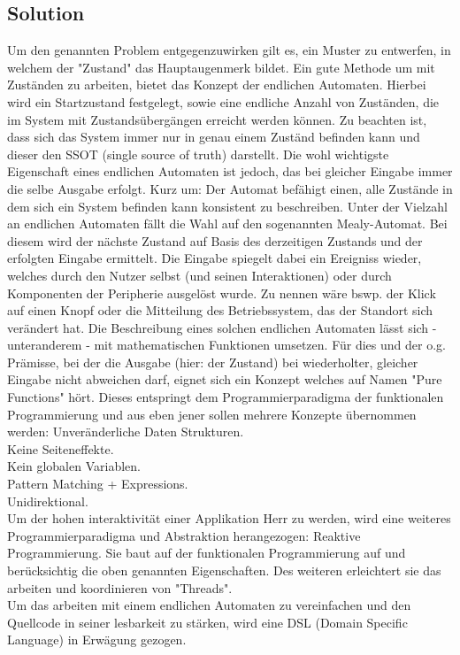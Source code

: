 \subsection{Solution}
\label{subsec:solution}

Um den genannten Problem entgegenzuwirken gilt es, ein Muster zu entwerfen,
in welchem der "Zustand" das Hauptaugenmerk bildet.
Ein gute Methode um mit Zuständen zu arbeiten, bietet das Konzept der endlichen Automaten.
Hierbei wird ein Startzustand festgelegt, sowie eine endliche Anzahl von Zuständen, die im System mit
Zustandsübergängen erreicht werden können. Zu beachten ist, dass sich das System immer nur in genau
einem Zuständ befinden kann und dieser den SSOT (single source of truth) darstellt.
Die wohl wichtigste Eigenschaft eines endlichen Automaten ist jedoch, das bei gleicher Eingabe
immer die selbe Ausgabe erfolgt.
Kurz um: Der Automat befähigt einen, alle Zustände in dem sich ein System befinden kann
konsistent zu beschreiben. 
Unter der Vielzahl an endlichen Automaten fällt die Wahl auf den sogenannten Mealy-Automat.
Bei diesem wird der nächste Zustand auf Basis des derzeitigen Zustands und der erfolgten Eingabe ermittelt.
Die Eingabe spiegelt dabei ein Ereigniss wieder, welches durch den Nutzer selbst (und seinen Interaktionen) 
oder durch Komponenten der Peripherie ausgelöst wurde. Zu nennen wäre bswp. 
der Klick auf einen Knopf oder die Mitteilung des Betriebssystem, das der Standort sich verändert hat.
Die Beschreibung eines solchen endlichen Automaten lässt sich - unteranderem - mit
mathematischen Funktionen umsetzen. Für dies und der o.g. Prämisse, bei der die Ausgabe (hier: der Zustand) bei wiederholter,
gleicher Eingabe nicht abweichen darf, eignet sich ein Konzept welches auf Namen "Pure Functions" hört.
Dieses entspringt dem Programmierparadigma der funktionalen Programmierung und aus eben jener sollen mehrere Konzepte übernommen werden:
Unveränderliche Daten Strukturen. \\
Keine Seiteneffekte. \\
Kein globalen Variablen. \\
Pattern Matching + Expressions. \\
Unidirektional.\\
Um der hohen interaktivität einer Applikation Herr zu werden, wird eine weiteres Programmierparadigma und
Abstraktion herangezogen: Reaktive Programmierung.
Sie baut auf der funktionalen Programmierung auf und berücksichtig die oben genannten Eigenschaften.
Des weiteren erleichtert sie das arbeiten und koordinieren von "Threads". 
\\
Um das arbeiten mit einem endlichen Automaten zu vereinfachen und den Quellcode in seiner lesbarkeit zu stärken,
wird eine DSL (Domain Specific Language) in Erwägung gezogen.



